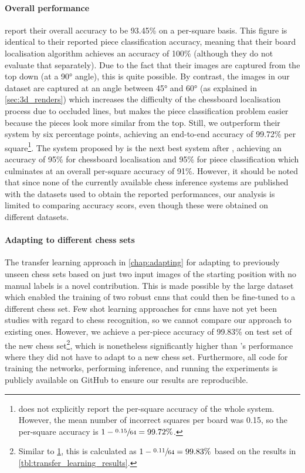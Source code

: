 \documentclass[../main.tex]{subfiles}
\begin{document}
\paragraph{Overall performance}
\Textcite{mehta2020} report their overall accuracy to be 93.45\% on a per-square basis.
This figure is identical to their reported piece classification accuracy, meaning that their board localisation algorithm achieves an accuracy of 100\% (although they do not evaluate that separately).
Due to the fact that their images are captured from the top down (at a 90° angle), this is quite possible.
By contrast, the images in our dataset are captured at an angle between 45° and 60° (as explained in \cref{sec:3d_renders}) which increases the difficulty of the chessboard localisation process due to occluded lines, but makes the piece classification problem easier because the pieces look more similar from the top.
Still, we outperform their system by six percentage points, achieving an end-to-end accuracy of 99.72\% per square\footnote{
    \label{ft:per_piece}
     does not explicitly report the per-square accuracy of the whole system.
    However, the mean number of incorrect squares per board was 0.15, so the per-square accuracy is $1-\sfrac{0.15}{64}=99.72\%$.
}.
The system proposed by \Textcite{czyzewski2020} is the next best system after \cite{mehta2020}, achieving an accuracy of 95\% for chessboard localisation and 95\% for piece classification which culminates at an overall per-square accuracy of 91\%.
However, it should be noted that since none of the currently available chess inference systems are published with the datasets used to obtain the reported performances, our analysis is limited to comparing accuracy scors, even though these were obtained on different datasets.

\paragraph{Adapting to different chess sets}
The transfer learning approach in \cref{chap:adapting} for adapting to previously unseen chess sets based on just two input images of the starting position with no manual labels is a novel contribution.
This is made possible by the large dataset which enabled the training of two robust \glspl{cnn} that could then be fine-tuned to a different chess set.
Few shot learning approaches for \glspl{cnn} have not yet been studies with regard to chess recognition, so we cannot compare our approach to existing ones.
However, we achieve a per-piece accuracy of 99.83\% on test set of the new chess set\footnote{
    Similar to \cref{ft:per_piece}, this is calculated as $1-\sfrac{0.11}{64}=99.83\%$ based on the results in \cref{tbl:transfer_learning_results}.
}, which is nonetheless significantly higher than \textcite{mehta2020}'s performance where they did not have to adapt to a new chess set.
Furthermore, all code for training the networks, performing inference, and running the experiments is publicly available on GitHub to ensure our results are reproducible.

\ifSubfilesClassLoaded{%
\printglossary[type=\acronymtype]%
\printbibliography%
}{}%
\end{document}
